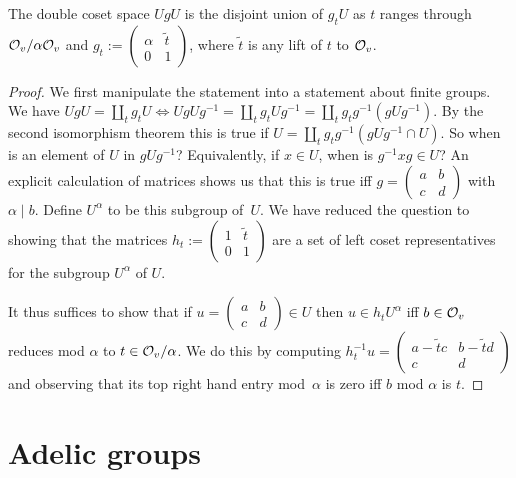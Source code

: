 \begin{lemma}
  \label{bijOn_unipotent_mul_diagU1_U1diagU1}
  \leanok
  The double coset space $UgU$ is the disjoint union of $g_tU$ as $t$ ranges
  through $\mathcal{O}_v/\alpha\mathcal{O}_v$ and $g_t:=\begin{pmatrix}\alpha&\tilde{t}\\0&1\end{pmatrix}$,
  where $\tilde{t}$ is any lift of $t$ to $\mathcal{O}_v$.
\end{lemma}
\begin{proof}
  \leanok
  We first manipulate the statement into a statement about finite groups.
  We have $UgU=\coprod_t g_tU\iff UgUg^{-1}=\coprod_t g_tUg^{-1}=\coprod_t g_tg^{-1}(gUg^{-1})$.
  By the second isomorphism theorem this is true if
  $U=\coprod_t g_tg^{-1}(gUg^{-1}\cap U)$. So when is an element of $U$
  in $gUg^{-1}$? Equivalently, if $x\in U$, when is $g^{-1}xg\in U$? An explicit calculation
  of matrices shows us that this is true iff $g=\begin{pmatrix} a&b\\c&d\end{pmatrix}$ with
  $\alpha\mid b$. Define $U^\alpha$ to be this subgroup of~$U$. We have reduced the question
  to showing that the matrices $h_t:=\begin{pmatrix}1&\tilde{t}\\0&1\end{pmatrix}$
  are a set of left coset representatives for the subgroup $U^\alpha$ of $U$.

  It thus suffices to show that if $u=\begin{pmatrix} a&b\\c&d\end{pmatrix}\in U$
  then $u\in h_tU^\alpha$ iff $b\in\mathcal{O}_v$ reduces mod $\alpha$ to $t\in\mathcal{O}_v/\alpha$.
  We do this by computing $h_t^{-1}u=\begin{pmatrix} a-\tilde{t}c&b-\tilde{t}d\\c&d\end{pmatrix}$
  and observing that its top right hand entry mod~$\alpha$ is zero iff $b$ mod $\alpha$ is $t$.
\end{proof}

\section{Adelic groups}

